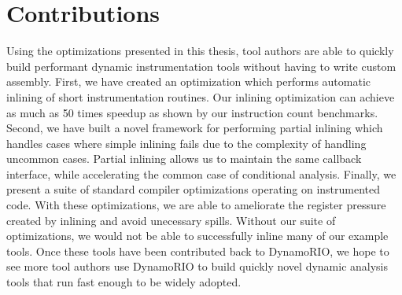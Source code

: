 \chapter{Contributions}


Using the optimizations presented in this thesis, tool authors are able to
quickly build performant dynamic instrumentation tools without having to write
custom assembly.  First, we have created an optimization which performs
automatic inlining of short instrumentation routines.  Our inlining optimization
can achieve as much as 50 times speedup as shown by our instruction count
benchmarks.  Second, we have built a novel framework for performing partial
inlining which handles cases where simple inlining fails due to the complexity
of handling uncommon cases.  Partial inlining allows us to maintain the same
callback interface, while accelerating the common case of conditional analysis.
Finally, we present a suite of standard compiler optimizations operating on
instrumented code.  With these optimizations, we are able to ameliorate the
register pressure created by inlining and avoid unecessary spills.  Without our
suite of optimizations, we would not be able to successfully inline many of our
example tools.  Once these tools have been contributed back to DynamoRIO, we
hope to see more tool authors use DynamoRIO to build quickly novel dynamic
analysis tools that run fast enough to be widely adopted.
